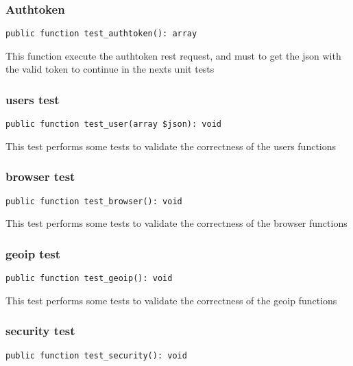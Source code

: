 \documentclass[a4paper]{article}
\begin{document}
\hypertarget{toc376}{}
\subsubsection{Authtoken}

\begin{lstlisting}
public function test_authtoken(): array
\end{lstlisting}

This function execute the authtoken rest request, and must to get the
json with the valid token to continue in the nexts unit tests

\hypertarget{toc377}{}
\subsubsection{users test}

\begin{lstlisting}
public function test_user(array $json): void
\end{lstlisting}

This test performs some tests to validate the correctness
of the users functions

\hypertarget{toc378}{}
\subsubsection{browser test}

\begin{lstlisting}
public function test_browser(): void
\end{lstlisting}

This test performs some tests to validate the correctness
of the browser functions

\hypertarget{toc379}{}
\subsubsection{geoip test}

\begin{lstlisting}
public function test_geoip(): void
\end{lstlisting}

This test performs some tests to validate the correctness
of the geoip functions

\hypertarget{toc380}{}
\subsubsection{security test}

\begin{lstlisting}
public function test_security(): void
\end{lstlisting}
\end{document}
